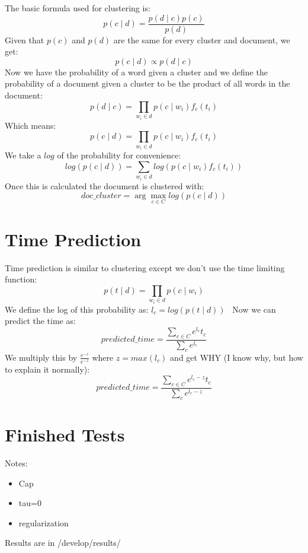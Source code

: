 \documentclass[11pt,a4paper]{article}
\begin{document}
The basic formula used for clustering is:
\begin{equation}
  p(c \mid d) = \frac{p(d \mid c) p(c)}{p(d)}
\end{equation}
Given that $p(c)$ and $p(d)$ are the same for every cluster and document, we get:
\begin{equation}
  p(c \mid d) \propto p(d \mid c)
\end{equation}
Now we have the probability of a word given a cluster and we define the probability of a document given a cluster to be the product of all words in the document:
\begin{equation}
  p(d \mid c) = \prod_{w_i \in d}{p(c \mid w_i) f_c(t_i)}
\end{equation}
Which means:
\begin{equation}
	p(c \mid d) = \prod_{w_i \in d}{p(c \mid w_i) f_c(t_i)}
\end{equation}
We take a $log$ of the probability for convenience:
\begin{equation}
  log(p(c \mid d)) = \sum_{w_i \in d}{log(p(c \mid w_i) f_c(t_i))}
\end{equation}
Once this is calculated the document is clustered with:
\begin{equation}
  doc\_cluster = \arg\max_{c \in C} log(p(c \mid d))
\end{equation}

\section{Time Prediction}
Time prediction is similar to clustering except we don't use the time limiting function:
\begin{equation}
	p(t \mid d) = \prod_{w_i \in d}{p(c \mid w_i)}
\end{equation}
We define the log of this probability as: $ l_c = log(p(t \mid d)) $ \
Now we can predict the time as:
\begin{equation}
  predicted\_time = \frac{\sum_{c \in C}{e^{l_c}t_c}}{\sum_c{e^{l_c}}}
\end{equation}
We multiply this by $\frac{e^{-z}}{e^{-z}}$ where $z = max(l_c)$ and get WHY (I know why, but how to explain it normally):
\begin{equation}
  predicted\_time = \frac{\sum_{c \in C}{e^{l_c - z}t_c}}{\sum_c{e^{l_c - z}}}
\end{equation}

\section{Finished Tests}
Notes:
\begin{itemize}
  \item Cap
  \item tau=0
  \item regularization
\end{itemize}
Results are in /develop/results/
\end{document}
